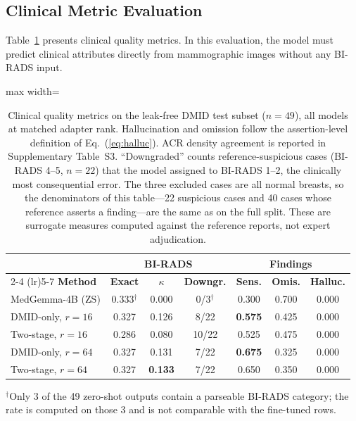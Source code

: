 \documentclass{wlscirep}
\begin{document}
\subsection*{Clinical Metric Evaluation}

Table~\ref{tab:clinical} presents clinical quality metrics. In this evaluation, the model must predict clinical attributes directly from mammographic images without any BI-RADS input.

\begin{table}[H]
\centering
\caption{Clinical quality metrics on the leak-free DMID test subset ($n=49$), all models at matched adapter rank. Hallucination and omission follow the assertion-level definition of Eq.~(\ref{eq:halluc}). ACR density agreement is reported in Supplementary Table~S3. ``Downgraded'' counts reference-suspicious cases (BI-RADS 4--5, $n=22$) that the model assigned to BI-RADS 1--2, the clinically most consequential error. The three excluded cases are all normal breasts, so the denominators of this table---22 suspicious cases and 40 cases whose reference asserts a finding---are the same as on the full split. These are surrogate measures computed against the reference reports, not expert adjudication.}
\label{tab:clinical}
\begin{adjustbox}{max width=\textwidth}
\begin{tabular}{lcccccc}
\toprule
& \multicolumn{3}{c}{\textbf{BI-RADS}} & \multicolumn{3}{c}{\textbf{Findings}} \\
\cmidrule(lr){2-4} \cmidrule(lr){5-7}
\textbf{Method} & \textbf{Exact} & $\kappa$ & \textbf{Downgr.} & \textbf{Sens.} & \textbf{Omis.} & \textbf{Halluc.} \\
\midrule
MedGemma-4B (ZS) & 0.333$^\dagger$ & 0.000 & 0/3$^\dagger$ & 0.300 & 0.700 & 0.000 \\
\midrule
DMID-only, $r{=}16$ & 0.327 & 0.126 & 8/22 & \textbf{0.575} & 0.425 & 0.000 \\
Two-stage, $r{=}16$ & 0.286 & 0.080 & 10/22 & 0.525 & 0.475 & 0.000 \\
DMID-only, $r{=}64$ & 0.327 & 0.131 & 7/22 & \textbf{0.675} & 0.325 & 0.000 \\
Two-stage, $r{=}64$ & 0.327 & \textbf{0.133} & 7/22 & 0.650 & 0.350 & 0.000 \\
\bottomrule
\end{tabular}
\end{adjustbox}

\footnotesize $^\dagger$Only 3 of the 49 zero-shot outputs contain a parseable BI-RADS category; the rate is computed on those 3 and is not comparable with the fine-tuned rows.
\end{table}
\end{document}
